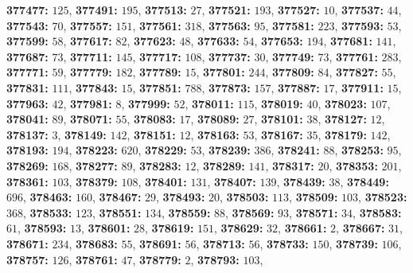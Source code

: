 \textsf{\bfseries 377477:} $125$, \textsf{\bfseries 377491:} $195$, \textsf{\bfseries 377513:} $27$, \textsf{\bfseries 377521:} $193$, \textsf{\bfseries 377527:} $10$, \textsf{\bfseries 377537:} $44$, \textsf{\bfseries 377543:} $70$, \textsf{\bfseries 377557:} $151$, \textsf{\bfseries 377561:} $318$, \textsf{\bfseries 377563:} $95$, \textsf{\bfseries 377581:} $223$, \textsf{\bfseries 377593:} $53$, \textsf{\bfseries 377599:} $58$, \textsf{\bfseries 377617:} $82$, \textsf{\bfseries 377623:} $48$, \textsf{\bfseries 377633:} $54$, \textsf{\bfseries 377653:} $194$, \textsf{\bfseries 377681:} $141$, \textsf{\bfseries 377687:} $73$, \textsf{\bfseries 377711:} $145$, \textsf{\bfseries 377717:} $108$, \textsf{\bfseries 377737:} $30$, \textsf{\bfseries 377749:} $73$, \textsf{\bfseries 377761:} $283$, \textsf{\bfseries 377771:} $59$, \textsf{\bfseries 377779:} $182$, \textsf{\bfseries 377789:} $15$, \textsf{\bfseries 377801:} $244$, \textsf{\bfseries 377809:} $84$, \textsf{\bfseries 377827:} $55$, \textsf{\bfseries 377831:} $111$, \textsf{\bfseries 377843:} $15$, \textsf{\bfseries 377851:} $788$, \textsf{\bfseries 377873:} $157$, \textsf{\bfseries 377887:} $17$, \textsf{\bfseries 377911:} $15$, \textsf{\bfseries 377963:} $42$, \textsf{\bfseries 377981:} $8$, \textsf{\bfseries 377999:} $52$, \textsf{\bfseries 378011:} $115$, \textsf{\bfseries 378019:} $40$, \textsf{\bfseries 378023:} $107$, \textsf{\bfseries 378041:} $89$, \textsf{\bfseries 378071:} $55$, \textsf{\bfseries 378083:} $17$, \textsf{\bfseries 378089:} $27$, \textsf{\bfseries 378101:} $38$, \textsf{\bfseries 378127:} $12$, \textsf{\bfseries 378137:} $3$, \textsf{\bfseries 378149:} $142$, \textsf{\bfseries 378151:} $12$, \textsf{\bfseries 378163:} $53$, \textsf{\bfseries 378167:} $35$, \textsf{\bfseries 378179:} $142$, \textsf{\bfseries 378193:} $194$, \textsf{\bfseries 378223:} $620$, \textsf{\bfseries 378229:} $53$, \textsf{\bfseries 378239:} $386$, \textsf{\bfseries 378241:} $88$, \textsf{\bfseries 378253:} $95$, \textsf{\bfseries 378269:} $168$, \textsf{\bfseries 378277:} $89$, \textsf{\bfseries 378283:} $12$, \textsf{\bfseries 378289:} $141$, \textsf{\bfseries 378317:} $20$, \textsf{\bfseries 378353:} $201$, \textsf{\bfseries 378361:} $103$, \textsf{\bfseries 378379:} $108$, \textsf{\bfseries 378401:} $131$, \textsf{\bfseries 378407:} $139$, \textsf{\bfseries 378439:} $38$, \textsf{\bfseries 378449:} $696$, \textsf{\bfseries 378463:} $160$, \textsf{\bfseries 378467:} $29$, \textsf{\bfseries 378493:} $20$, \textsf{\bfseries 378503:} $113$, \textsf{\bfseries 378509:} $103$, \textsf{\bfseries 378523:} $368$, \textsf{\bfseries 378533:} $123$, \textsf{\bfseries 378551:} $134$, \textsf{\bfseries 378559:} $88$, \textsf{\bfseries 378569:} $93$, \textsf{\bfseries 378571:} $34$, \textsf{\bfseries 378583:} $61$, \textsf{\bfseries 378593:} $13$, \textsf{\bfseries 378601:} $28$, \textsf{\bfseries 378619:} $151$, \textsf{\bfseries 378629:} $32$, \textsf{\bfseries 378661:} $2$, \textsf{\bfseries 378667:} $31$, \textsf{\bfseries 378671:} $234$, \textsf{\bfseries 378683:} $55$, \textsf{\bfseries 378691:} $56$, \textsf{\bfseries 378713:} $56$, \textsf{\bfseries 378733:} $150$, \textsf{\bfseries 378739:} $106$, \textsf{\bfseries 378757:} $126$, \textsf{\bfseries 378761:} $47$, \textsf{\bfseries 378779:} $2$, \textsf{\bfseries 378793:} $103$, 
